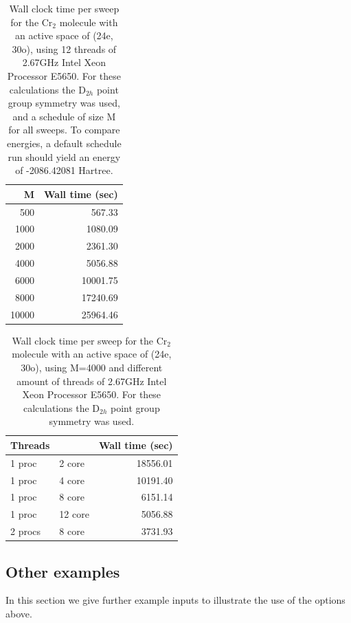 \documentclass[letterpaper,12pt,aps, pra]{revtex4-1}
\begin{document}
\begin{table}
\begin{center}
\begin{tabular}{rr}
\hline
\hline
M& Wall time (sec)\\
\hline
500     &567.33\\
1000	&1080.09\\
2000	&2361.30\\
4000	&5056.88\\
6000	&10001.75\\
8000	&17240.69\\
10000	&25964.46\\
\hline
\hline
\end{tabular}
\end{center}
\caption{Wall clock time per sweep for the Cr$_2$ molecule with an active space
of (24e, 30o), using 12 threads of 2.67GHz Intel Xeon Processor E5650. For
these calculations the D$_{2h}$ point group symmetry was used, and a schedule
of size M for all sweeps.
To compare energies, a default schedule run should yield an energy of -2086.42081 Hartree.
} \label{tab:timing}
\end{table}

\begin{table}
\begin{center}
\begin{tabular}{llr}
\hline
\hline
Threads && Wall time (sec)\\
\hline
1 proc &2 core  &18556.01\\
1 proc &4 core  &10191.40\\
1 proc &8 core  &6151.14\\
1 proc &12 core &5056.88\\
2 procs &8 core &3731.93\\
\hline
\hline
\end{tabular}
\end{center}
\caption{Wall clock time per sweep for the Cr$_2$ molecule with an
active space of (24e, 30o), using M=4000 and different amount of
threads of 2.67GHz Intel Xeon Processor E5650. For these calculations
the D$_{2h}$ point group symmetry was used.} \label{tab:thread}
\end{table}


\subsection{Other examples}
In this section we give further example inputs to illustrate
the use of the options above.
\end{document}
